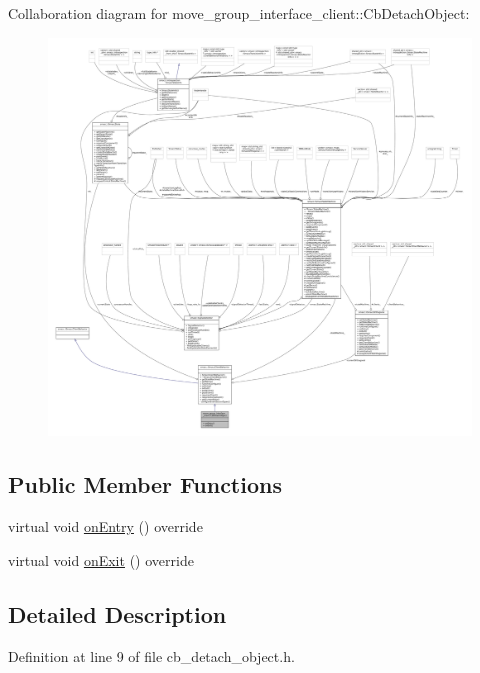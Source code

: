 Collaboration diagram for move\+\_\+group\+\_\+interface\+\_\+client\+:\+:Cb\+Detach\+Object\+:
\nopagebreak
\begin{figure}[H]
\begin{center}
\leavevmode
\includegraphics[width=350pt]{classmove__group__interface__client_1_1CbDetachObject__coll__graph}
\end{center}
\end{figure}
\subsection*{Public Member Functions}
\begin{DoxyCompactItemize}
\item 
virtual void \hyperlink{classmove__group__interface__client_1_1CbDetachObject_aaed049b8c346b38a82acb4641aa90df6}{on\+Entry} () override
\item 
virtual void \hyperlink{classmove__group__interface__client_1_1CbDetachObject_a43c672ede95c7dc49f98b5b7b623c43f}{on\+Exit} () override
\end{DoxyCompactItemize}


\subsection{Detailed Description}


Definition at line 9 of file cb\+\_\+detach\+\_\+object.\+h.



